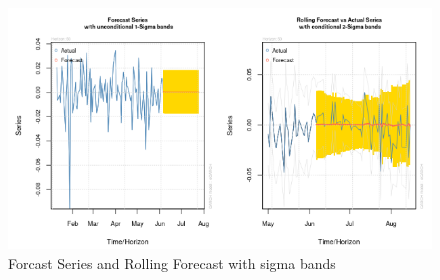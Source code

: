 \documentclass{article}
\begin{document}
\begin{figure}[h]
	\centering
	\includegraphics[width=0.9\linewidth]{forecast.png}
	\caption{Forcast Series and Rolling Forecast with sigma bands}
	\label{fig:forecast-series}
\end{figure}
\end{document}
